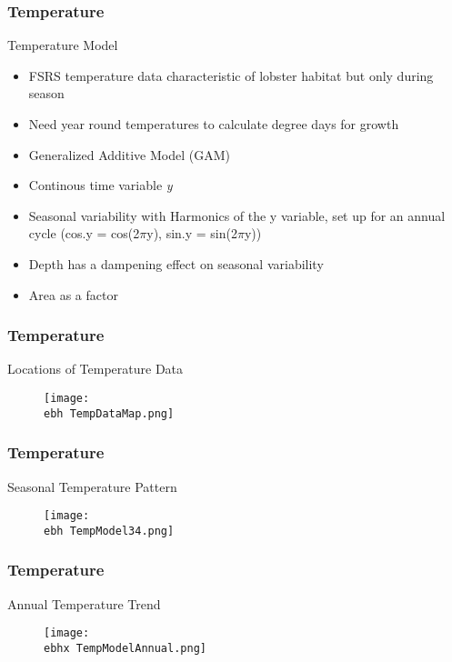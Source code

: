 \documentclass{beamer}
\newcommand{\ebh}{\string~/bio.data/bio.lobster/figures/LFA3438Framework2019/} %
\newcommand{\ebhx}{\string~/bio.data/bio.lobster/figures/LFA3438Framework2019/figures/Brad/} %
\begin{document}
\begin{frame}
\frametitle{Temperature}
Temperature Model
\begin{itemize}
\item FSRS temperature data characteristic of lobster habitat but only during season
\item Need year round temperatures to calculate degree days for growth
\item Generalized Additive Model (GAM)
\item Continous time variable \textit{y}
\item Seasonal variability with Harmonics of the y variable, set up for an annual cycle (cos.y = cos(2$\pi$y), sin.y = sin(2$\pi$y))
\item Depth has a dampening effect on seasonal variability
\item Area as a factor
\end{itemize}
\end{frame}


\begin{frame}
\frametitle{Temperature}
Locations of Temperature Data
\begin{figure}
        \begin{center}
            \texttt{[image: \\ebh TempDataMap.png]}
        \end{center}
    \end{figure}
\end{frame}

\begin{frame}
\frametitle{Temperature}
Seasonal Temperature Pattern
\begin{figure}
        \begin{center}
            \texttt{[image: \\ebh TempModel34.png]}
        \end{center}
    \end{figure}
\end{frame}

\begin{frame}
\frametitle{Temperature}
Annual Temperature Trend
\begin{figure}
        \begin{center}
            \texttt{[image: \\ebhx TempModelAnnual.png]}
        \end{center}
    \end{figure}
\end{frame}
\end{document}
